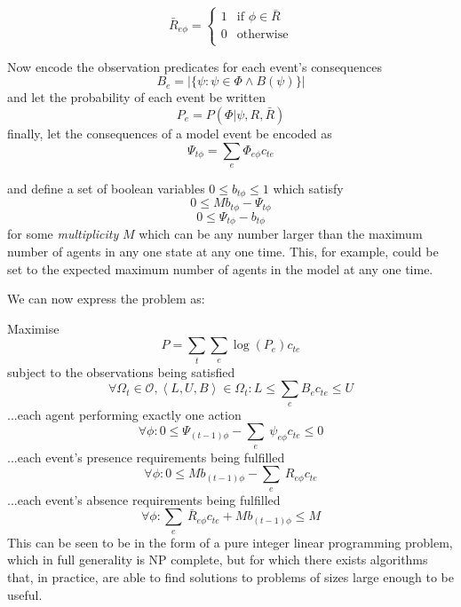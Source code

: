 \documentclass{article}
\begin{document}
\begin{equation}
\bar{R}_{e\phi} =
\begin{cases}
1&\text{if } \phi \in \bar{R}\\
0&\text{otherwise}\\
\end{cases}
\end{equation}

Now encode the observation predicates for each event's consequences
\begin{equation}
B_e = |\{\psi: \psi\in\Phi \wedge B(\psi)\}|
\end{equation}
and let the probability of each event be written
\[
P_e = P(\Phi|\psi,R,\bar{R})
\]
finally, let the consequences of a model event be encoded as
\begin{equation}
\Psi_{t\phi} = \sum_e\Phi_{e\phi}c_{te}
\label{stateIndicator}
\end{equation}

and define a set of boolean variables $0 \le b_{t\phi} \le 1$ which satisfy
\begin{equation}
0 \le Mb_{t\phi} - \Psi_{t\phi}
\label{bGEconstraint}
\end{equation}
\begin{equation}
0 \le \Psi_{t\phi} - b_{t\phi} 
\label{bLEconstraint}
\end{equation}
for some \textit{multiplicity} $M$ which can be any number larger than the maximum number of agents in any one state at any one time. This, for example, could be set to the expected maximum number of agents in the model at any one time.

We can now express the problem as:

Maximise
\begin{equation}
P = \sum_t\sum_e \log(P_e)c_{te}
\end{equation}
subject to the observations being satisfied
\begin{equation}
\forall \Omega_t \in \mathcal{O}, \left<L,U,B\right> \in \Omega_t: L \le \sum_e B_e c_{te} \le U
\label{observation}
\end{equation}
...each agent performing exactly one action
\begin{equation}
\forall\phi: 0 \le \Psi_{(t-1)\phi} -  \sum_e\ \psi_{e\phi} c_{te} \le 0
\label{IPagency}
\end{equation}
...each event's presence requirements being fulfilled
\begin{equation}
\forall\phi: 0 \le Mb_{(t-1)\phi} - \sum_e\ R_{e\phi} c_{te} 
\end{equation}
...each event's absence requirements being fulfilled
\begin{equation}
\forall\phi: \sum_e\ \bar{R}_{e\phi} c_{te} + Mb_{(t-1)\phi} \le M
\label{absenceConstraint}
\end{equation}
This can be seen to be in the form of a pure integer linear programming problem, which in full generality is NP complete, but for which there exists algorithms that, in practice, are able to find solutions to problems of sizes large enough to be useful.
\end{document}
